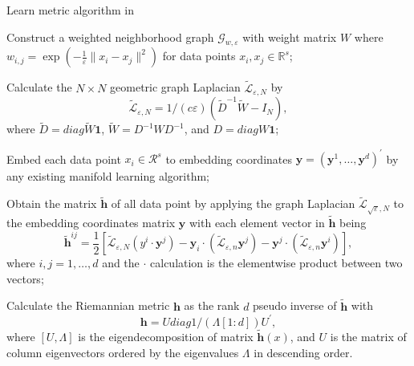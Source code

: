 \documentclass[11pt,a4paper,]{article}
\begin{document}
\begin{algorithm}[!htb]
  \caption{Learn metric algorithm in \cite{Perrault-Joncas2013-pq} }
  \label{alg:learnmetric}
  \DontPrintSemicolon
  \SetAlgoLined
  \BlankLine
  \begin{algorithmic}[1]

  \STATE Construct a weighted neighborhood graph $\mathcal{G}_{w,\varepsilon}$ with weight matrix $W$ where $w_{i,j}=\exp(-\frac{1}{\varepsilon}\|x_i-x_j\|^2)$ for data points $x_i,x_j \in \mathbb{R}^s$;

  \STATE Calculate the $N\times N$ geometric graph Laplacian $\widetilde{\mathcal{L}}_{\varepsilon,N}$ by
  $$
  \widetilde{\mathcal{L}}_{\varepsilon,N} = 1/(c\varepsilon)(\widetilde{D}^{-1} \widetilde{W} - I_N),
  $$
  where $\widetilde{D}=diag{\widetilde{W}\pmb{1}}$, $\widetilde{W} = D^{-1}WD^{-1}$, and $D = diag{W\pmb{1}}$;

  \STATE Embed each data point $x_i\in \mathcal{R}^s$ to embedding coordinates $\pmb{y}=(\pmb{y}^1,\dots,\pmb{y}^d)^\prime$ by any existing manifold learning algorithm;

  \STATE Obtain the matrix $\pmb{\tilde{h}}$ of all data point by applying the graph Laplacian $\widetilde{\mathcal{L}}_{\sqrt{\varepsilon},N}$ to the embedding coordinates matrix $\pmb{y}$ with each element vector in $\pmb{\tilde{h}}$ being
  $$
    \pmb{\tilde{h}}^{i j} = \frac{1}{2} \left[\tilde{\mathcal{L}}_{\varepsilon, N}\left(y^i \cdot \pmb{y}^j\right) - \pmb{y}_i \cdot\left(\tilde{\mathcal{L}}_{\varepsilon, n} \pmb{y}^j\right) - \pmb{y}^j \cdot\left(\tilde{\mathcal{L}}_{\varepsilon, n} \pmb{y}^i\right)\right],
  $$
  where $i,j=1,\dots,d$ and the $\cdot$ calculation is the elementwise product between two vectors; 

  \STATE Calculate the Riemannian metric $\pmb{h}$ as the rank $d$ pseudo inverse of $\tilde{\pmb{    h}}$ with 
  $$
    \pmb{h} = U diag{1/(\Lambda[1:d])} U^\prime,
  $$
  where $[U, \Lambda]$ is the eigendecomposition of matrix $\pmb{\tilde{h}}(x)$, and $U$ is the matrix of column eigenvectors ordered by the eigenvalues $\Lambda$ in descending order.

  \end{algorithmic}
\end{algorithm}
\end{document}
